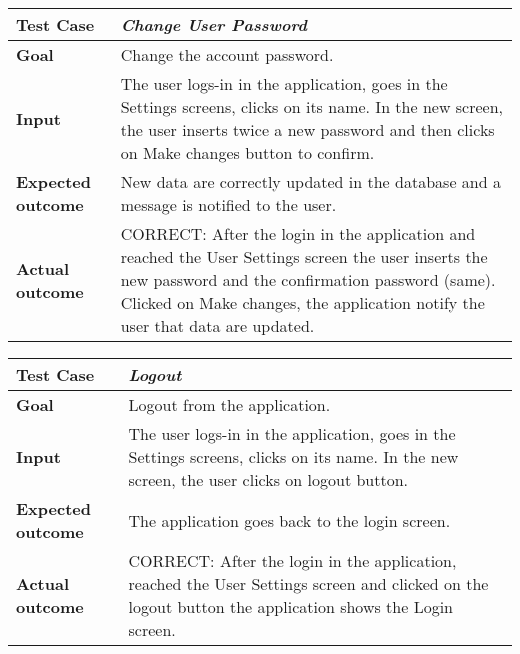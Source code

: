 \begin{table}[H]
\begin{tabular}{| p{} | p{} |}
  \hline
  \textbf{Test Case} & \textit{Change User Password} \\ \hline
  \textbf{Goal} & Change the account password. \\ \hline
  \textbf{Input} & The user logs-in in the application, goes in the Settings screens, clicks on its name. In the new screen, the user inserts twice a new password and then clicks on Make changes button to confirm. \\ \hline
  \textbf{Expected outcome} & New data are correctly updated in the database and a message is notified to the user.\\ \hline
  \textbf{Actual outcome} & CORRECT: After the login in the application and reached the User Settings screen the user inserts the new password and the confirmation password (same). Clicked on Make changes, the application notify the user that data are updated.\\ \hline
\end{tabular}
\end{table}

\begin{table}[H]
\begin{tabular}{| p{} | p{} |}
  \hline
  \textbf{Test Case} & \textit{Logout} \\ \hline
  \textbf{Goal} & Logout from the application. \\ \hline
  \textbf{Input} & The user logs-in in the application, goes in the Settings screens, clicks on its name. In the new screen, the user clicks on logout button. \\ \hline
  \textbf{Expected outcome} & The application goes back to the login screen.\\ \hline
  \textbf{Actual outcome} & CORRECT: After the login in the application, reached the User Settings screen and clicked on the logout button the application shows the Login screen.\\ \hline
\end{tabular}
\end{table}

